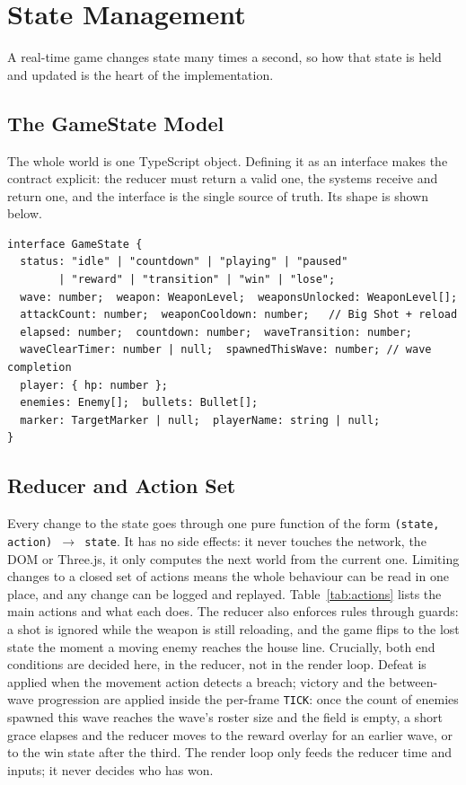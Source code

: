\documentclass[12pt,a4paper]{report}
\begin{document}
\section{State Management}\label{sec:state}

A real-time game changes state many times a second, so how that state is held
and updated is the heart of the implementation.

\subsection{The GameState Model}

The whole world is one TypeScript object. Defining it as an interface makes the
contract explicit: the reducer must return a valid one, the systems receive and
return one, and the interface is the single source of truth. Its shape is shown
below.

\begin{verbatim}
interface GameState {
  status: "idle" | "countdown" | "playing" | "paused"
        | "reward" | "transition" | "win" | "lose";
  wave: number;  weapon: WeaponLevel;  weaponsUnlocked: WeaponLevel[];
  attackCount: number;  weaponCooldown: number;   // Big Shot + reload
  elapsed: number;  countdown: number;  waveTransition: number;
  waveClearTimer: number | null;  spawnedThisWave: number; // wave completion
  player: { hp: number };
  enemies: Enemy[];  bullets: Bullet[];
  marker: TargetMarker | null;  playerName: string | null;
}
\end{verbatim}

\subsection{Reducer and Action Set}

Every change to the state goes through one pure function of the form
\texttt{(state, action) $\to$ state}. It has no side effects: it never touches
the network, the DOM or Three.js, it only computes the next world from the
current one. Limiting changes to a closed set of actions means the whole
behaviour can be read in one place, and any change can be logged and replayed.
Table~\ref{tab:actions} lists the main actions and what each does. The reducer
also enforces rules through guards: a shot is ignored while the weapon is still
reloading, and the game flips to the lost state the moment a moving enemy reaches
the house line. Crucially, both end conditions are decided here, in the reducer,
not in the render loop. Defeat is applied when the movement action detects a
breach; victory and the between-wave progression are applied inside the per-frame
\texttt{TICK}: once the count of enemies spawned this wave reaches the wave's
roster size and the field is empty, a short grace elapses and the reducer moves to
the reward overlay for an earlier wave, or to the win state after the third. The
render loop only feeds the reducer time and inputs; it never decides who has won.
\end{document}
